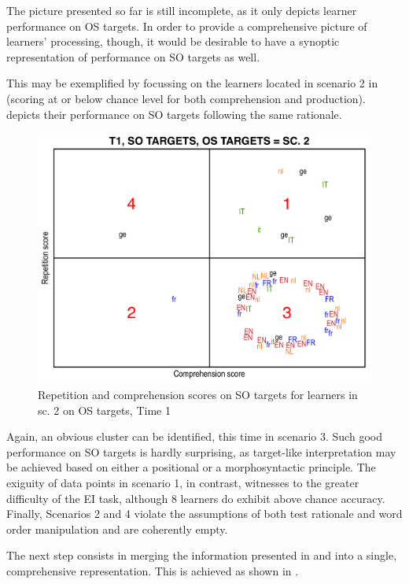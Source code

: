 The picture presented so far is still incomplete, as it only depicts learner performance on OS targets. In order to provide a comprehensive picture of learners' processing, though, it would be desirable to have a synoptic representation of performance on SO targets as well. 

This may be exemplified by focussing on the learners located in scenario 2 in  (scoring at or below chance level for both comprehension and production).  depicts their performance on SO targets following the same rationale. 

\begin{figure}
    \includegraphics[width=\textwidth]{figures/06-3.pdf}
    \caption{Repetition and comprehension scores on SO targets for learners in sc. 2 on OS targets, Time 1}
    \label{fig:06:3}
\end{figure}

Again, an obvious cluster can be identified, this time in scenario 3. Such good performance on SO targets is hardly surprising, as target-like interpretation may be achieved based on either a positional or a morphosyntactic principle. The exiguity of data points in scenario 1, in contrast, witnesses to the greater difficulty of the EI task, although 8 learners do exhibit above chance accuracy. Finally, Scenarios 2 and 4 violate the assumptions of both test rationale and word order manipulation and are coherently empty.

The next step consists in merging the information presented in  and  into a single, comprehensive representation. This is achieved as shown in .

